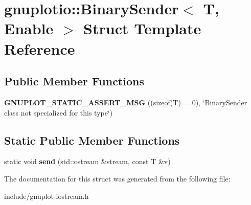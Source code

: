 \hypertarget{structgnuplotio_1_1BinarySender}{}\section{gnuplotio\+:\+:Binary\+Sender$<$ T, Enable $>$ Struct Template Reference}
\label{structgnuplotio_1_1BinarySender}
\subsection*{Public Member Functions}
\begin{DoxyCompactItemize}
\item 
\mbox{\label{structgnuplotio_1_1BinarySender_ad964fa720473ff517cfb461361f645c8}} 
{\bfseries G\+N\+U\+P\+L\+O\+T\+\_\+\+S\+T\+A\+T\+I\+C\+\_\+\+A\+S\+S\+E\+R\+T\+\_\+\+M\+SG} ((sizeof(T)==0), \char`\"{}Binary\+Sender class not specialized for this type\char`\"{})
\end{DoxyCompactItemize}
\subsection*{Static Public Member Functions}
\begin{DoxyCompactItemize}
\item 
\mbox{\label{structgnuplotio_1_1BinarySender_a4b5dd22b7679c4f0ce4d8e75b36c8a21}} 
static void {\bfseries send} (std\+::ostream \&stream, const T \&v)
\end{DoxyCompactItemize}


The documentation for this struct was generated from the following file\+:\begin{DoxyCompactItemize}
\item 
include/gnuplot-\/iostream.\+h\end{DoxyCompactItemize}
